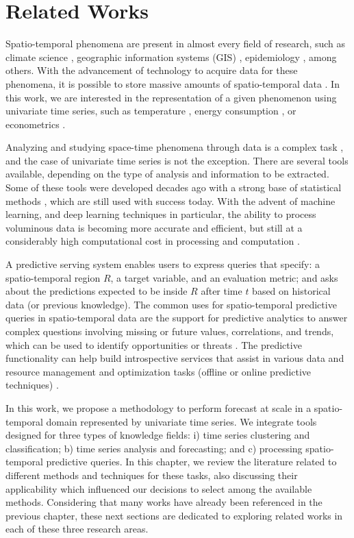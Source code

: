 \chapter{Related Works}
\label{chapter_Related_Works}

Spatio-temporal phenomena are present in almost every field of research, such as climate science \cite{Faghmous2014, Guevara2020}, geographic information systems (GIS) \cite{ElGeresy2002, Shekhar2015}, epidemiology \cite{Malchow2007, Cabrera2019}, among others. With the advancement of technology to acquire data for these phenomena, it is possible to store massive amounts of spatio-temporal data \cite{Atluri2018}. In this work, we are interested in the representation of a given phenomenon using univariate time series, such as temperature \cite{Muhammet2012, Romilly2005}, energy consumption \cite{Abdelaal2008}, or econometrics \cite{Moral2003}.

Analyzing and studying space-time phenomena through data is a complex task \cite{Rao2008}, and the case of univariate time series is not the exception. There are several tools available, depending on the type of analysis and information to be extracted. Some of these tools were developed decades ago with a strong base of statistical methods \cite{Cressie2011, Finkenstadt2006}, which are still used with success today. With the advent of machine learning, and deep learning techniques in particular, the ability to process voluminous data is becoming more accurate and efficient, but still at a considerably high computational cost in processing and computation \cite{Yang2020, Karim2018}.

A predictive serving system \cite{Crankshaw2018} enables users to express queries that specify: a spatio-temporal region $R$, a target variable, and an evaluation metric; and asks about the predictions expected to be inside $R$ after time $t$ based on historical data (or previous knowledge). The common uses for spatio-temporal predictive queries in spatio-temporal data are the support for predictive analytics to answer complex questions involving missing or future values, correlations, and trends, which can be used to identify opportunities or threats \cite{Ghanta022019, Polyzotis2018}. The predictive functionality can help build introspective services that assist in various data and resource management and optimization tasks (offline or online predictive techniques) \cite{DeFilippo2018}.

In this work, we propose a methodology to perform forecast at scale in a spatio-temporal domain represented by univariate time series. We integrate tools designed for three types of knowledge fields: i) time series clustering and classification; b) time series analysis and forecasting; and c) processing spatio-temporal predictive queries. In this chapter, we review the literature related to different methods and techniques for these tasks, also discussing their applicability which influenced our decisions to select among the available methods. Considering that many works have already been referenced in the previous chapter, these next sections are dedicated to exploring related works in each of these three research areas.

